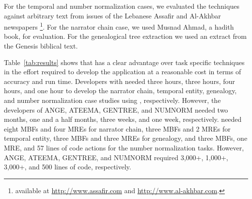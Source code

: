 \begin{table}[tb!]
  \centering
  \caption{\framework MBF and user-defined relation accuracy }
  \label{tab:mbfer}%
\end{table}%


For the temporal and number normalization cases, 
we evaluated the techniques against arbitrary text from issues of 
the Lebanese Assafir and Al-Akhbar newspapers
\footnote{available at \url{http://www.assafir.com} and 
\url{http://www.al-akhbar.com}.}. 
For the narrator chain case, we used
Musnad Ahmad, a hadith book, for evaluation. 
For the genealogical tree extraction we used 
an extract from the Genesis biblical text.


Table~\ref{tab:results} shows that \framework has a clear advantage over 
task specific techniques in the effort required to develop the application at 
a reasonable cost in terms of accuracy and run time. 
Developers with \framework needed three hours, three hours, four hours, and one hour 
to develop the narrator chain, temporal entity, genealogy, and number 
normalization case studies using \framework, respectively. 
However, the developers of ANGE, ATEEMA, GENTREE, and 
NUMNORM needed two months, one and a half months, 
three weeks, and one week, respectively. 
\framework needed eight MBFs and four MREs for narrator chain, 
three MBFs and 2 MREs for temporal entity, three MBFs and three MREs for 
genealogy, and three MBFs, one MRE, and 57 lines of code actions for the number normalization tasks. 
However, ANGE, ATEEMA, GENTREE, and NUMNORM required 
3,000+, 1,000+, 3,000+, and 500 lines of code, respectively.

